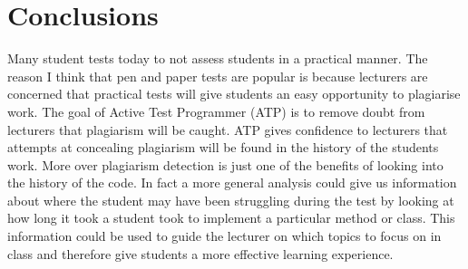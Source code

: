 \documentclass[twocolumn]{article}
\begin{document}
\section{Conclusions}
Many student tests today to not assess students in a practical manner. The
reason I think that pen and paper tests are popular is because lecturers are
concerned that practical tests will give students an easy opportunity to
plagiarise work.  The goal of Active Test Programmer (ATP) is to remove doubt
from lecturers that plagiarism will be caught. ATP gives confidence to lecturers
that attempts at concealing plagiarism will be found in the history of the
students work. More over plagiarism detection is just one of the benefits of
looking into the history of the code. In fact a more general analysis could give
us information about where the student may have been struggling during the test
by looking at how long it took a student took to implement a particular method
or class. This information could be used to guide the lecturer on which topics
to focus on in class and therefore give students a more effective learning
experience.



\end{document}
